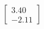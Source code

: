 \documentclass[preview]{standalone}
\begin{document}
\begin{align*}
\begin{bmatrix} 3.40 \\ -2.11 \end{bmatrix}
\end{align*}
\end{document}
